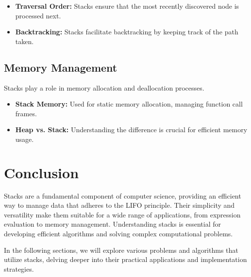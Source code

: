 \begin{itemize}
    \item \textbf{Traversal Order:} Stacks ensure that the most recently discovered node is processed next.
    \item \textbf{Backtracking:} Stacks facilitate backtracking by keeping track of the path taken.
\end{itemize}

\subsection{Memory Management}

Stacks play a role in memory allocation and deallocation processes.

\begin{itemize}
    \item \textbf{Stack Memory:} Used for static memory allocation, managing function call frames.
    \item \textbf{Heap vs. Stack:} Understanding the difference is crucial for efficient memory usage.
\end{itemize}

\section{Conclusion}

Stacks are a fundamental component of computer science, providing an efficient way to manage data that adheres to the LIFO principle. Their simplicity and versatility make them suitable for a wide range of applications, from expression evaluation to memory management. Understanding stacks is essential for developing efficient algorithms and solving complex computational problems.

In the following sections, we will explore various problems and algorithms that utilize stacks, delving deeper into their practical applications and implementation strategies.